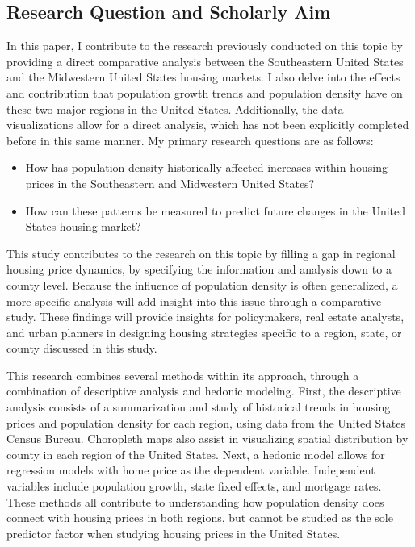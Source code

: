 \documentclass[journal,article,submit,pdftex,moreauthors]{Definitions/mdpi}
\begin{document}
\subsection{Research Question and Scholarly Aim}

In this paper, I contribute to the research previously conducted on this topic by providing a direct comparative analysis between the Southeastern United States and the Midwestern United States housing markets. I also delve into the effects and contribution that population growth trends and population density have on these two major regions in the United States. Additionally, the data visualizations allow for a direct analysis, which has not been explicitly completed before in this same manner. My primary research questions are as follows:

\begin{itemize}
    \item How has population density historically affected increases within housing prices in the Southeastern and Midwestern United States?
    \item How can these patterns be measured to predict future changes in the United States housing market?
\end{itemize}

This study contributes to the research on this topic by filling a gap in regional housing price dynamics, by specifying the information and analysis down to a county level. Because the influence of population density is often generalized, a more specific analysis will add insight into this issue through a comparative study. These findings will provide insights for policymakers, real estate analysts, and urban planners in designing housing strategies specific to a region, state, or county discussed in this study.

This research combines several methods within its approach, through a combination of descriptive analysis and hedonic modeling. First, the descriptive analysis consists of a summarization and study of historical trends in housing prices and population density for each region, using data from the United States Census Bureau. Choropleth maps also assist in visualizing spatial distribution by county in each region of the United States. Next, a hedonic model allows for regression models with home price as the dependent variable. Independent variables include population growth, state fixed effects, and mortgage rates. These methods all contribute to understanding how population density does connect with housing prices in both regions, but cannot be studied as the sole predictor factor when studying housing prices in the United States. 
\end{document}
